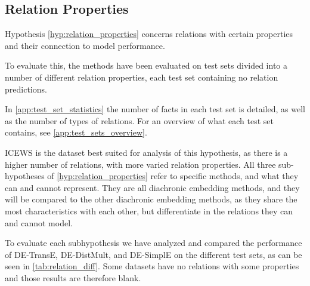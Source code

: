 \subsection{Relation Properties}
\label{sec:relation_properties_experiment}
%


Hypothesis \autoref{hyp:relation_properties} concerns relations with certain properties and their connection to model performance.

To evaluate this, the methods have been evaluated on test sets divided into a number of different relation properties, each test set containing no relation predictions.

In \autoref{app:test_set_statistics} the number of facts in each test set is detailed, as well as the number of types of relations.
For an overview of what each test set contains, see \autoref{app:test_sets_overview}.

ICEWS is the dataset best suited for analysis of this hypothesis, as there is a higher number of relations, with more varied relation properties.
All three sub-hypotheses of \autoref{hyp:relation_properties} refer to specific methods, and what they can and cannot represent. They are all diachronic embedding methods, and they will be compared to the other diachronic embedding methods, as they share the most characteristics with each other, but differentiate in the relations they can and cannot model.

To evaluate each subhypothesis we have analyzed and compared the performance of DE-TransE, DE-DistMult, and DE-SimplE on the different test sets, as can be seen in \autoref{tab:relation_diff}. Some datasets have no relations with some properties and those results are therefore blank.

